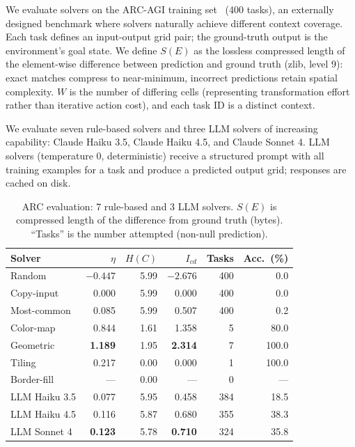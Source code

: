 \documentclass[runningheads,a4paper]{llncs}
\begin{document}
We evaluate solvers on the ARC-AGI training set~\cite{chollet2019measure} (400 tasks), an externally designed benchmark where solvers naturally achieve different context coverage. Each task defines an input-output grid pair; the ground-truth output is the environment's goal state. We define $S(E)$ as the lossless compressed length of the element-wise difference between prediction and ground truth (zlib, level 9): exact matches compress to near-minimum, incorrect predictions retain spatial complexity. $W$ is the number of differing cells (representing transformation effort rather than iterative action cost), and each task ID is a distinct context.

We evaluate seven rule-based solvers and three LLM solvers of increasing capability: Claude Haiku 3.5, Claude Haiku 4.5, and Claude Sonnet 4. LLM solvers (temperature 0, deterministic) receive a structured prompt with all training examples for a task and produce a predicted output grid; responses are cached on disk.

\begin{table}[t]
\centering
\caption{ARC evaluation: 7 rule-based and 3 LLM solvers. $S(E)$ is compressed length of the difference from ground truth (bytes). ``Tasks'' is the number attempted (non-null prediction).}
\label{tab:arc}
\small
\begin{tabular}{lrrrrr}
\toprule
Solver & $\eta$ & $H(C)$ & $I_{cd}$ & Tasks & Acc.\ (\%) \\
\midrule
Random & $-0.447$ & 5.99 & $-2.676$ & 400 & 0.0 \\
Copy-input & 0.000 & 5.99 & 0.000 & 400 & 0.0 \\
Most-common & 0.085 & 5.99 & 0.507 & 400 & 0.2 \\
Color-map & 0.844 & 1.61 & 1.358 & 5 & 80.0 \\
Geometric & \textbf{1.189} & 1.95 & \textbf{2.314} & 7 & 100.0 \\
Tiling & 0.217 & 0.00 & 0.000 & 1 & 100.0 \\
Border-fill & --- & 0.00 & --- & 0 & --- \\
\midrule
LLM Haiku 3.5 & 0.077 & 5.95 & 0.458 & 384 & 18.5 \\
LLM Haiku 4.5 & 0.116 & 5.87 & 0.680 & 355 & 38.3 \\
LLM Sonnet 4 & \textbf{0.123} & 5.78 & \textbf{0.710} & 324 & 35.8 \\
\bottomrule
\end{tabular}
\end{table}
\end{document}
